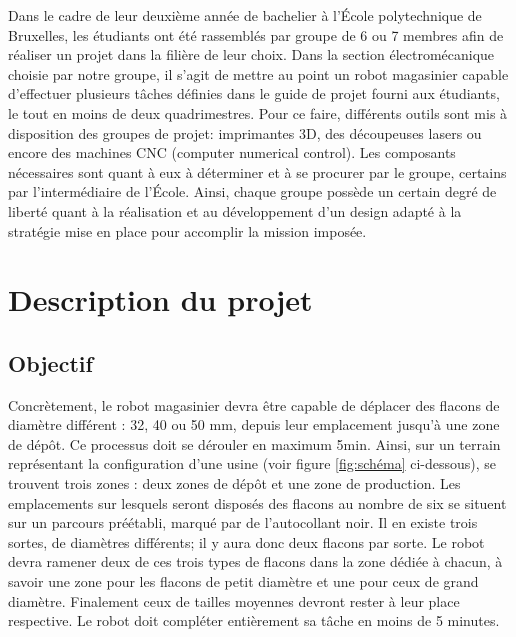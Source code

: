 \documentclass[a4paper,11pt]{article}
\begin{document}
Dans le cadre de leur deuxième année de bachelier à l'École polytechnique de Bruxelles, les étudiants ont été rassemblés par groupe de 6 ou 7 membres afin de réaliser un projet dans la filière de leur choix. Dans la section électromécanique choisie par notre groupe, il s'agit de mettre au point un robot magasinier capable d'effectuer plusieurs tâches définies dans le guide de projet fourni aux étudiants, le tout en moins de deux quadrimestres. Pour ce faire, différents outils sont mis à disposition des groupes de projet: imprimantes 3D, des découpeuses lasers ou encore des machines CNC (computer numerical control). Les composants nécessaires sont quant à eux à déterminer et à se procurer par le groupe, certains par l'intermédiaire de l'École. Ainsi, chaque groupe possède un certain degré de liberté quant à la réalisation et au développement d'un design adapté à la stratégie mise en place pour accomplir la mission imposée.

\section{Description du projet}

\subsection{Objectif}

Concrètement, le robot magasinier devra être capable de déplacer des flacons de diamètre différent : 32, 40 ou 50 mm, depuis leur emplacement jusqu'à une zone de dépôt. Ce processus doit se dérouler en maximum 5min. Ainsi, sur un terrain représentant la configuration d'une usine (voir figure \ref{fig:schéma} ci-dessous), se trouvent trois zones : deux zones de dépôt et une zone de production. Les emplacements sur lesquels seront disposés des flacons au nombre de six se situent sur un parcours préétabli, marqué par de l'autocollant noir. Il en existe trois sortes, de diamètres différents; il y aura donc deux flacons par sorte. Le robot devra ramener deux de ces trois types de flacons dans la zone dédiée à chacun, à savoir une zone pour les flacons de petit diamètre et une pour ceux de grand diamètre. Finalement ceux de tailles moyennes devront rester à leur place respective. Le robot doit compléter entièrement sa tâche en moins de 5 minutes.
\end{document}
